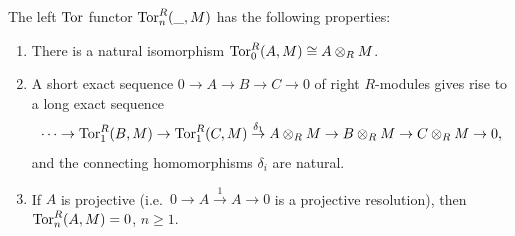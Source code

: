 \begin{thm}\label{thm Tor properties}
    The left $\operatorname{Tor}$ functor $\operatorname{Tor}_n^R(\_,M)$ has the following properties:
    \begin{enumerate}
        \item There is a natural isomorphism $\operatorname{Tor}_0^R(A,M)\cong A\otimes_R M$.
        \item A short exact sequence $0\to A\to B\to C\to 0$ of right $R$-modules gives rise to a long exact sequence
        \[\cdots\to \operatorname{Tor}_1^R(B,M)\to \operatorname{Tor}_1^R(C,M)\overset{\delta_1}{\to} A\otimes_R M\to B\otimes_R M\to C\otimes_R M\to 0,\]
        and the connecting homomorphisms $\delta_i$ are natural.
        \item If $A$ is projective (i.e.~$0\to A\overset{1}{\to} A\to 0$ is a projective resolution), then $\operatorname{Tor}_n^R(A,M)=0$, $n\geq 1$.
    \end{enumerate}
\end{thm}

